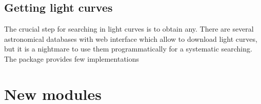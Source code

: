 \documentclass[final,5p,times,twocolumn,authoryear]{elsarticle}
\begin{document}
\subsection{ Getting light curves }
\label{connectors_sec }

The crucial step for searching in light curves is to obtain any. There are several astronomical databases with web interface which allow to download light curves, but it is a nightmare to use them programmatically for a systematic searching. The package provides few implementations 



\section{New modules}
\label{new_imple}














 






\end{document}
